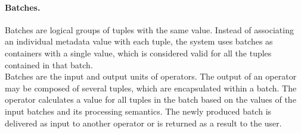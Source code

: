 \vspace{-10pt}
\paragraph*{Batches.}
\label{sec:batches}
Batches are logical groups of tuples with the same \sic value. Instead of associating an individual
metadata value with each tuple, the system uses batches as containers with a single \sic value, which is
considered valid for all the tuples contained in that batch.\\
Batches are the input and output units of operators. The output of an operator may be composed of
several tuples, which are encapsulated within a batch. The operator calculates a \sic value for all
tuples in the batch based on the \sic values of the input batches and its processing semantics.
The newly produced batch is delivered as input to another operator or is returned as a result to the
user.

